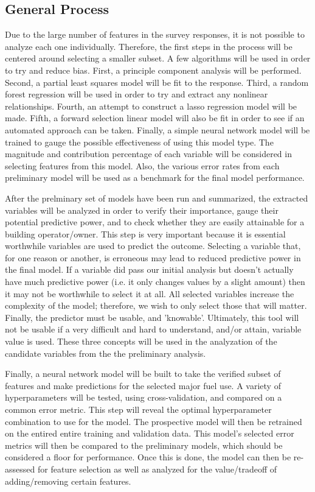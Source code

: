 \subsection{General Process}

Due to the large number of features in the survey responses, it is not possible to analyze each one individually.  Therefore, the first steps in the process will be centered around selecting a smaller subset.  A few algorithms will be used in order to try and reduce bias.  First, a principle component analysis will be performed.  Second, a partial least squares model will be fit to the response.  Third, a random forest regression will be used in order to try and extract any nonlinear relationships.  Fourth, an attempt to construct a lasso regression model will be made.  Fifth, a forward selection linear model will also be fit in order to see if an automated approach can be taken.  Finally, a simple neural network model will be trained to gauge the possible effectiveness of using this model type.  The magnitude and contribution percentage of each variable will be considered in selecting features from this model.  Also, the various error rates from each preliminary model will be used as a benchmark for the final model performance.

After the prelminary set of models have been run and summarized, the extracted variables will be analyzed in order to verify their importance, gauge their potential predictive power, and to check whether they are easily attainable for a building operator/owner.  This step is very important because it is essential worthwhile variables are used to predict the outcome.  Selecting a variable that, for one reason or another, is erroneous may lead to reduced predictive power in the final model.  If a variable did pass our initial analysis but doesn't actually have much predictive power (i.e. it only changes values by a slight amount) then it may not be worthwhile to select it at all.  All selected variables increase the complexity of the model; therefore, we wish to only select those that will matter.  Finally, the predictor must be usable, and 'knowable'.  Ultimately, this tool will not be usable if a very difficult and hard to understand, and/or attain, variable value is used.  These three concepts will be used in the analyzation of the candidate variables from the the preliminary analysis. 

Finally, a neural network model will be built to take the verified subset of features and make predictions for the selected major fuel use.  A variety of hyperparameters will be tested, using cross-validation, and compared on a common error metric.  This step will reveal the optimal hyperparameter combination to use for the model.  The prospective model will then be retrained on the entired entire training and validation data.  This model's selected error metrics will then be compared to the preliminary models, which should be considered a floor for performance.  Once this is done, the model can then be re-assessed for feature selection as well as analyzed for the value/tradeoff of adding/removing certain features.